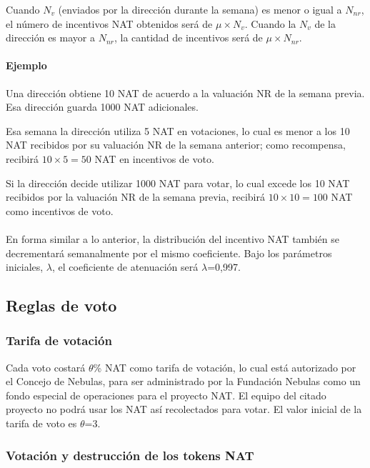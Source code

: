 \noindent Cuando $N_{v}$ (enviados por la dirección durante la semana) es menor o igual a $N_{nr}$, el número de incentivos NAT obtenidos será de $\mu\times N_{v}$. Cuando la $N_{v}$ de la dirección es mayor a $N_{nr}$, la cantidad de incentivos será de $\mu\times N_{nr}$.

\paragraph{Ejemplo}

Una dirección obtiene 10 NAT de acuerdo a la valuación NR de la semana previa. Esa dirección guarda 1000 NAT adicionales.

Esa semana la dirección utiliza 5 NAT en votaciones, lo cual es menor a los 10 NAT recibidos por su valuación NR de la semana anterior; como recompensa, recibirá $10\times5=50$ NAT en incentivos de voto.

Si la dirección decide utilizar 1000 NAT para votar, lo cual excede los 10 NAT recibidos por la valuación NR de la semana previa, recibirá $10\times10=100$ NAT como incentivos de voto.

\paragraph{}

En forma similar a lo anterior, la distribución del incentivo NAT también se decrementará semanalmente por el mismo coeficiente. Bajo los parámetros iniciales, $\lambda$, el coeficiente de atenuación será $\lambda$=0,997.

\subsection{Reglas de voto}

\subsubsection{Tarifa de votación}

Cada voto costará $\theta$\% NAT como tarifa de votación, lo cual está autorizado por el Concejo de Nebulas, para ser administrado por la Fundación Nebulas como un fondo especial de operaciones para el proyecto NAT. El equipo del citado proyecto no podrá usar los NAT así recolectados para votar. El valor inicial de la tarifa de voto es $\theta$=3.

\subsubsection{Votación y destrucción de los tokens NAT}

